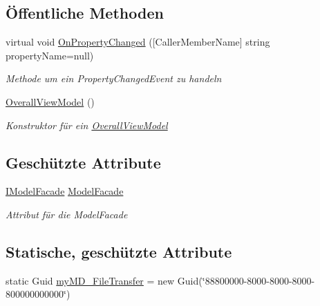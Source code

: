 \subsection*{Öffentliche Methoden}
\begin{DoxyCompactItemize}
\item 
virtual void \mbox{\hyperlink{classmy_m_d_1_1_view_model_1_1_overall_view_model_1_1_overall_view_model_a0333c153387ba2d38fb31eeb0419bfcf}{On\+Property\+Changed}} (\mbox{[}Caller\+Member\+Name\mbox{]} string property\+Name=null)
\begin{DoxyCompactList}\small\item\em Methode um ein Property\+Changed\+Event zu handeln \end{DoxyCompactList}\item 
\mbox{\hyperlink{classmy_m_d_1_1_view_model_1_1_overall_view_model_1_1_overall_view_model_a1cc6b22c187773cdc72ee92f21ea5aba}{Overall\+View\+Model}} ()
\begin{DoxyCompactList}\small\item\em Konstruktor für ein \mbox{\hyperlink{classmy_m_d_1_1_view_model_1_1_overall_view_model_1_1_overall_view_model}{Overall\+View\+Model}} \end{DoxyCompactList}\end{DoxyCompactItemize}
\subsection*{Geschützte Attribute}
\begin{DoxyCompactItemize}
\item 
\mbox{\hyperlink{interfacemy_m_d_1_1_model_interface_1_1_model_facade_interface_1_1_i_model_facade}{I\+Model\+Facade}} \mbox{\hyperlink{classmy_m_d_1_1_view_model_1_1_overall_view_model_1_1_overall_view_model_ab1b0e7b2ed9ae07614caa1e45b942e3f}{Model\+Facade}}
\begin{DoxyCompactList}\small\item\em Attribut für die Model\+Facade \end{DoxyCompactList}\end{DoxyCompactItemize}
\subsection*{Statische, geschützte Attribute}
\begin{DoxyCompactItemize}
\item 
static Guid \mbox{\hyperlink{classmy_m_d_1_1_view_model_1_1_overall_view_model_1_1_overall_view_model_a40cabfa5e7d2f08979a9ba5c3c8eead8}{my\+M\+D\+\_\+\+File\+Transfer}} = new Guid(\char`\"{}88800000-\/8000-\/8000-\/8000-\/800000000000\char`\"{})
\end{DoxyCompactItemize}
